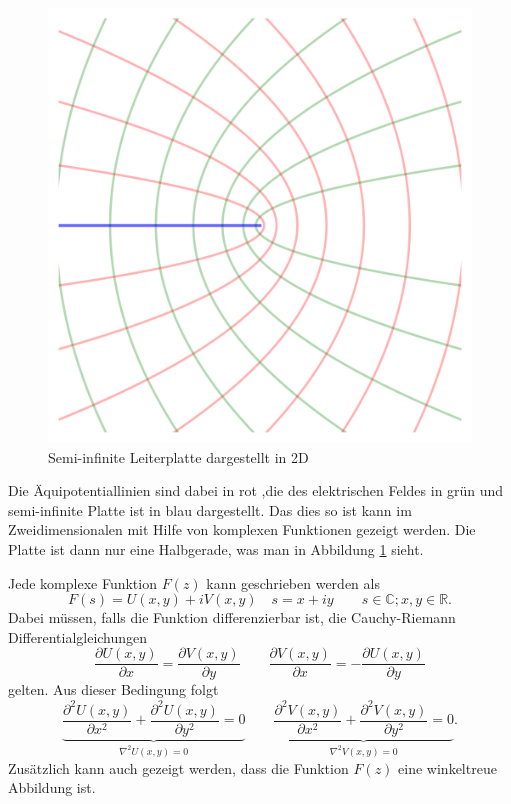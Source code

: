 \begin{figure}
\begin{minipage}{.25\textwidth}
	\includegraphics[width=\textwidth]{papers/parzyl/img/Plane_2D.png}
	\caption{Semi-infinite Leiterplatte dargestellt in 2D}
	\label{parzyl:fig:leiterplatte_2d}
	\end{minipage}
\end{figure}
Die Äquipotentiallinien sind dabei in rot ,die des elektrischen Feldes in grün und semi-infinite Platte ist in blau dargestellt.
Das dies so ist kann im Zweidimensionalen mit Hilfe von komplexen Funktionen gezeigt werden. Die Platte ist dann nur eine Halbgerade, was man in Abbildung \ref{parzyl:fig:leiterplatte_2d} sieht.


Jede komplexe Funktion $F(z)$ kann geschrieben werden als
\begin{equation}
	F(s) = U(x,y) + iV(x,y) \quad s = x + iy \qquad s \in \mathbb{C}; x,y \in \mathbb{R}.
\end{equation}  
Dabei müssen, falls die Funktion differenzierbar ist, die Cauchy-Riemann Differentialgleichungen 
\begin{equation}
	\frac{\partial U(x,y)}{\partial x} 
	=
	\frac{\partial V(x,y)}{\partial y} 
	\qquad
	\frac{\partial V(x,y)}{\partial x}
	=
	-\frac{\partial U(x,y)}{\partial y}
\end{equation}
gelten.
Aus dieser Bedingung folgt 
\begin{equation}
	\label{parzyl_e_feld_zweite_ab}
	\underbrace{
	\frac{\partial^2 U(x,y)}{\partial x^2}
	+ 
	\frac{\partial^2 U(x,y)}{\partial y^2}
	=
	0
	}_{\displaystyle{\nabla^2U(x,y)=0}}
	\qquad
	\underbrace{
	\frac{\partial^2 V(x,y)}{\partial x^2}
	+
	\frac{\partial^2 V(x,y)}{\partial y^2}
	=
	0
	}_{\displaystyle{\nabla^2V(x,y) = 0}}.
\end{equation}
Zusätzlich kann auch gezeigt werden, dass die Funktion $F(z)$ eine winkeltreue Abbildung ist.

